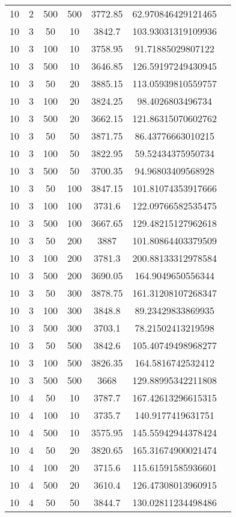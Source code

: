 {\begin{longtabu}{S
S
S
S
S
S[round-mode=places,round-precision=0]
S[round-mode=places,round-precision=0]}
10 & 2 & 500 & 500 & 3772.85 & 62.970846429121465 \\
10 & 3 & 50 & 10 & 3842.7 & 103.93031319109936 \\
10 & 3 & 100 & 10 & 3758.95 & 91.71885029807122 \\
10 & 3 & 500 & 10 & 3646.85 & 126.59197249430945 \\
10 & 3 & 50 & 20 & 3885.15 & 113.05939810559757 \\
10 & 3 & 100 & 20 & 3824.25 & 98.4026803496734 \\
10 & 3 & 500 & 20 & 3662.15 & 121.86315070602762 \\
10 & 3 & 50 & 50 & 3871.75 & 86.43776663010215 \\
10 & 3 & 100 & 50 & 3822.95 & 59.52434375950734 \\
10 & 3 & 500 & 50 & 3700.35 & 94.96803409568928 \\
10 & 3 & 50 & 100 & 3847.15 & 101.81074353917666 \\
10 & 3 & 100 & 100 & 3731.6 & 122.09766582535475 \\
10 & 3 & 500 & 100 & 3667.65 & 129.48215127962618 \\
10 & 3 & 50 & 200 & 3887 & 101.80864403379509 \\
10 & 3 & 100 & 200 & 3781.3 & 200.88133312978584 \\
10 & 3 & 500 & 200 & 3690.05 & 164.9049650556344 \\
10 & 3 & 50 & 300 & 3878.75 & 161.31208107268347 \\
10 & 3 & 100 & 300 & 3848.8 & 89.23429833869935 \\
10 & 3 & 500 & 300 & 3703.1 & 78.21502413219598 \\
10 & 3 & 50 & 500 & 3842.6 & 105.40749498968277 \\
10 & 3 & 100 & 500 & 3826.35 & 164.5816742532412 \\
10 & 3 & 500 & 500 & 3668 & 129.88995342211808 \\
10 & 4 & 50 & 10 & 3787.7 & 167.42613296615315 \\
10 & 4 & 100 & 10 & 3735.7 & 140.9177419631751 \\
10 & 4 & 500 & 10 & 3575.95 & 145.55942944378424 \\
10 & 4 & 50 & 20 & 3820.65 & 165.31674900021474 \\
10 & 4 & 100 & 20 & 3715.6 & 115.61591585936601 \\
10 & 4 & 500 & 20 & 3610.4 & 126.47308013960915 \\
10 & 4 & 50 & 50 & 3844.7 & 130.02811234498486 \\

\end{longtabu}}
